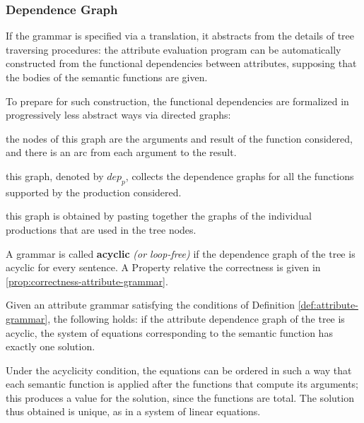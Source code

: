 \documentclass[english]{article}
\begin{document}
\subsubsection{Dependence Graph}

If the grammar is specified via a translation, it abstracts from the details of tree traversing procedures:
the attribute evaluation program can be automatically constructed from the functional dependencies between attributes, supposing that the bodies of the semantic functions are given.

To prepare for such construction, the functional dependencies are formalized in progressively less abstract ways via directed graphs:

\begin{definition}
  the nodes of this graph are the arguments and result of the function considered, and there is an arc from each argument to the result.
\end{definition}
\begin{definition}
  this graph, denoted by \(\textit{dep}_p\), collects the dependence graphs for all the functions supported by the production considered.
\end{definition}
\begin{definition}
  this graph is obtained by pasting together the graphs of the individual productions that are used in the tree nodes.
\end{definition}

\bigskip

A grammar is called \textbf{acyclic} \textit{(or loop-free)} if the dependence graph of the tree is acyclic for every sentence.
A Property relative the correctness is given in \ref{prop:correctness-attribute-grammar}.

\begin{property}
  \label{prop:correctness-attribute-grammar}
  Given an attribute grammar satisfying the conditions of Definition \ref{def:attribute-grammar}, the following holds:
  if the attribute dependence graph of the tree is acyclic, the system of equations corresponding to the semantic function has exactly one solution.
\end{property}

Under the acyclicity condition, the equations can be ordered in such a way that each semantic function is applied after the functions that compute its arguments;
this produces a value for the solution, since the functions are total.
The solution thus obtained is unique, as in a system of linear equations.
\end{document}
